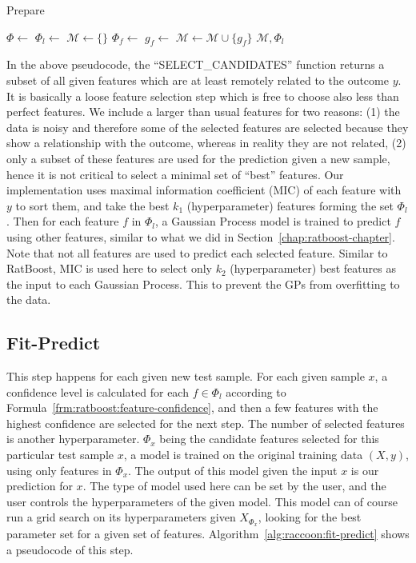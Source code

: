 \begin{algorithm}
\caption{Prepare}
\label{fig:raccoon:prepare1}
\begin{algorithmic}[1]
    \State $\Phi \gets $ 
    \State $\Phi_l \gets $ 
    \State $\mathcal{M} \gets \{\}$
        \State $\Phi_f \gets $ 
        \State $g_f \gets $ 
        \State $\mathcal{M} \gets \mathcal{M} \cup \{g_f\}$
    \EndFor
    \State \Return $\mathcal{M}, \Phi_l$
\EndFunction
\end{algorithmic}
\end{algorithm}

In the above pseudocode, the ``SELECT\_CANDIDATES'' function returns a subset of all given features which are at least remotely related to the outcome $y$. It is basically a loose feature selection step which is free to choose also less than perfect features. We include a larger than usual features for two reasons: (1) the data is noisy and therefore some of the selected features are selected because they show a relationship with the outcome, whereas in reality they are not related, (2) only a subset of these features are used for the prediction given a new sample, hence it is not critical to select a minimal set of ``best'' features. Our implementation uses maximal information coefficient (MIC) of each feature with $y$ to sort them, and take the best $k_1$ (hyperparameter) features forming the set $\Phi_l$. Then for each feature $f$ in $\Phi_l$, a Gaussian Process model is trained to predict $f$ using other features, similar to what we did in Section~\ref{chap:ratboost-chapter}. Note that not all features are used to predict each selected feature. Similar to RatBoost, MIC is used here to select only $k_2$ (hyperparameter) best features as the input to each Gaussian Process. This to prevent the GPs from overfitting to the data.

\subsection{Fit-Predict}
This step happens for each given new test sample. For each given sample $x$, a confidence level is calculated for each $f \in \Phi_l$ according to Formula~\ref{frm:ratboost:feature-confidence}, and then a few features with the highest confidence are selected for the next step. The number of selected features is another hyperparameter. $\Phi_x$ being the candidate features selected for this particular test sample $x$, a model is trained on the original training data $(X, y)$, using only features in $\Phi_x$. The output of this model given the input $x$ is our prediction for $x$. The type of model used here can be set by the user, and the user controls the hyperparameters of the given model. This model can of course run a grid search on its hyperparameters given $X_{\Phi_x}$, looking for the best parameter set for a given set of features. Algorithm~\ref{alg:raccoon:fit-predict} shows a pseudocode of this step.


